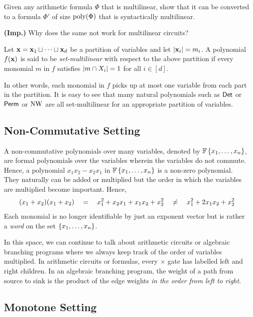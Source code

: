\begin{exercise}
Given any arithmetic formula $\Phi$ that is multilinear, show that it can be converted to a formula $\Phi'$ of size $\operatorname{poly}(\Phi)$ that is syntactically multilinear. 

\noindent
{\bf (Imp.)} Why does the same not work for multilinear circuits? 
\end{exercise}

\begin{definition}\label{defn:set-multilinear}
  Let $\mathbf{x} = \mathbf{x}_1 \sqcup \cdots \sqcup \mathbf{x}_d$ be a partition of variables and let $|\mathbf{x}_i| = m_i$.
A polynomial $f(\mathbf{x})$ is said to be \emph{set-multilinear} with respect to the above partition if every monomial $m$ in $f$ satisfies $\left|m \cap X_i\right| = 1$ for all $i \in [d]$.
\end{definition}
In other words, each monomial in $f$ picks up at most one variable from each part in the partition. It is easy to see that many natural polynomials such as $\operatorname{\mathsf{Det}}$ or $\operatorname{\mathsf{Perm}}$ or $\operatorname{\mathrm{NW}}$ are all set-multilinear for an appropriate partition of variables.

\subsection{Non-Commutative Setting}

A non-commutative polynomials over many variables, denoted by $\mathbb{F}\left\{x_1,\ldots, x_n\right\}$, are formal polynomials over the variables wherein the variables do not commute.
Hence, a polynomial $x_1x_2 - x_2x_1$ in $\mathbb{F}\left\{x_1,\ldots, x_n\right\}$ is a non-zero polynomial.
They naturally can be added or multiplied but the order in which the variables are multiplied become important.
Hence,
\[
(x_1 + x_2)(x_1 + x_2) \quad = \quad x_1^2 + x_2x_1 + x_1x_2 + x_2^2 \quad \neq \quad x_1^2 + 2x_1x_2 + x_2^2
\]
Each monomial is no longer identifiable by just an exponent vector but is rather a \emph{word} on the set $\left\{x_1,\ldots, x_n\right\}$. 

In this space, we can continue to talk about arithmetic circuits or algebraic branching programs where we always keep track of the order of variables multiplied.
In arithmetic circuits or formulas, every $\times$ gate has labelled left and right children.
In an algebraic branching program, the weight of a path from source to sink is the product of the edge weights \emph{in the order from left to right}.

\subsection{Monotone Setting}

